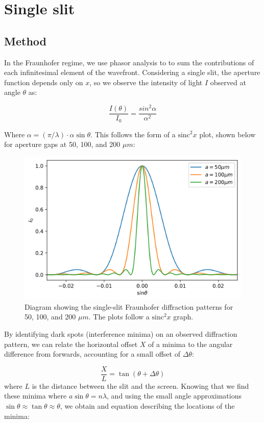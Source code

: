 \documentclass[a4paper]{article}
\begin{document}
\section{Single slit}
\subsection{Method}

In the Fraunhofer regime, we use phasor analysis to to sum the contributions of each infinitesimal element of the wavefront. Considering a single slit, the aperture function depends only on $x$, so we observe the intensity of light $I$ observed at angle $\theta$ as:

\begin{equation}
\frac{I(\theta)}{I_0}=\frac{sin^2\alpha}{\alpha^2}
\end{equation}

Where $\alpha=(\pi/\lambda)\cdot \alpha\sin\theta$. This follows the form of a $\text{sinc}^2 x$ plot, shown below for aperture gaps at 50, 100, and 200 $\mu m$:

\begin{figure}[h!]
\centerline{\includegraphics[scale=0.6]{demo.png}}%
\caption{Diagram showing the single-slit Fraunhofer diffraction patterns for 50, 100, and 200 $\mu m$. The plots follow a $\text{sinc}^2 x$ graph.}
\label{fig:demo}
\end{figure}

By identifying dark spots (interference minima) on an observed diffraction pattern, we can relate the horizontal offset $X$ of a minima to the angular difference from forwards, accounting for a small offset of $\Delta\theta$:

\begin{equation}
\frac XL=\tan(\theta+\Delta\theta)
\end{equation}
where $L$ is the distance between the slit and the screen. Knowing that we find these minima where $a\sin\theta=n\lambda$, and using the small angle approximations $\sin\theta\approx\tan\theta\approx\theta$, we obtain and equation describing the locations of the minima:
\end{document}
